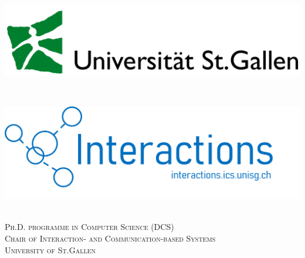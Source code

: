 \documentclass[a4paper,11pt]{article}
\begin{document}
\begin{titlepage}

\newcommand{\HRule}{\rule{\linewidth}{0.5mm}}
\setlength{\topmargin}{0in}
\center
 
\begin{minipage}{0.4\textwidth}
\begin{flushleft} \large
\hspace*{-0.5cm}
\includegraphics[scale=0.1]{logos/hsg.png}\\
\end{flushleft}
\end{minipage}
~
\begin{minipage}{0.5\textwidth}
\begin{flushright} \large
\hspace*{2cm}
\includegraphics[scale=0.3]{logos/interactions.png}\\
\end{flushright}
\end{minipage} \\[1cm]

\textsc{\Large Ph.D. programme in Computer Science (DCS)} \\[0.5cm] 
\textsc{\Large Chair of Interaction- and Communication-based Systems} \\[0.5cm]
\textsc{\LARGE University of St.Gallen}\\[2.0cm]



\end{titlepage}
\end{document}

